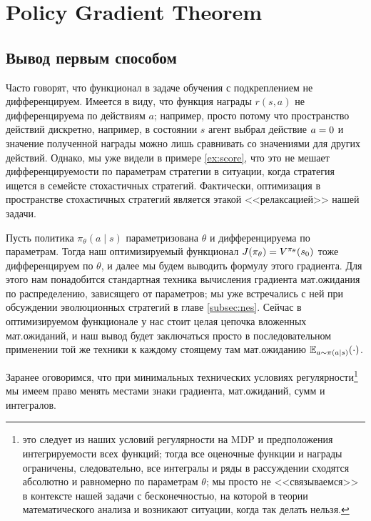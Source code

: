 \section{Policy Gradient Theorem}\label{PGTsection}

\subsection{Вывод первым способом}

Часто говорят, что функционал в задаче обучения с подкреплением не дифференцируем. Имеется в виду, что функция награды $r(s, a)$ не дифференцируема по действиям $a$; например, просто потому что пространство действий дискретно, например, в состоянии $s$ агент выбрал действие $a \HM = 0$ и значение полученной награды можно лишь сравнивать со значениями для других действий. Однако, мы уже видели в примере \ref{ex:score}, что это не мешает дифференцируемости по параметрам стратегии в ситуации, когда стратегия ищется в семейсте стохастичных стратегий. Фактически, оптимизация в пространстве стохастичных стратегий является этакой <<релаксацией>> нашей задачи.

Пусть политика $\pi_{\theta}(a \mid s)$ параметризована $\theta$ и дифференцируема по параметрам. Тогда наш оптимизируемый функционал $J(\pi_\theta) \HM= V^{\pi_\theta}(s_0)$ тоже дифференцируем по $\theta$, и далее мы будем выводить формулу этого градиента. Для этого нам понадобится стандартная техника вычисления градиента мат.ожидания по распределению, зависящего от параметров; мы уже встречались с ней при обсуждении эволюционных стратегий в главе \ref{subsec:nes}. Сейчас в оптимизируемом функционале у нас стоит целая цепочка вложенных мат.ожиданий, и наш вывод будет заключаться просто в последовательном применении той же техники к каждому стоящему там мат.ожиданию $\mathbb{E}_{a \sim \pi(a \mid s)} ( \cdot )$.

Заранее оговоримся, что при минимальных технических условиях регулярности\footnote{это следует из наших условий регулярности на MDP и предположения интегрируемости всех функций; тогда все оценочные функции и награды ограничены, следовательно, все интегралы и ряды в рассуждении сходятся абсолютно и равномерно по параметрам $\theta$; мы просто не <<связываемся>> в контексте нашей задачи с бесконечностью, на которой в теории математического анализа и возникают ситуации, когда так делать нельзя.} мы имеем право менять местами знаки градиента, мат.ожиданий, сумм и интегралов.

